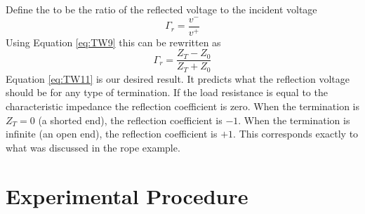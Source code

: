 \documentclass[12pt, a4paper, oneside, openright, titlepage]{book}
\begin{document}
\noindent Define the  to be the ratio of the reflected voltage
to the incident voltage \begin{equation}\label{eq:TW10}
    \Gamma_r = \frac{v^-}{v^+}
\end{equation}
Using Equation \ref{eq:TW9} this can be rewritten as \begin{equation}\label{eq:TW11}
    \Gamma_r = \frac{Z_T-Z_0}{Z_T+Z_0}
\end{equation}
Equation \ref{eq:TW11} is our desired result.  It predicts what the reflection voltage should be for any type of termination. If the load resistance is equal to the characteristic impedance the reflection coefficient is zero. When the termination is $Z_T = 0$ (a shorted end), the reflection coefficient is $-1$. When the termination is infinite (an open end), the reflection coefficient is $+1$. This corresponds exactly to what was discussed in the rope example.

\section{Experimental Procedure}
\end{document}
